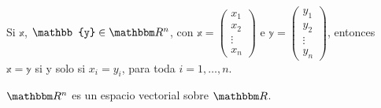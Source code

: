 \begin{observation}
    Si $\mathbb{x}$, $\mathbb{y} \in \RR[n]$, con $\displaystyle \mathbb{x} = \begin{pmatrix} x_1 \\ x_2 \\ \vdots \\ x_n \end{pmatrix}$ e $\displaystyle \mathbb{y} = \begin{pmatrix} y_1 \\ y_2 \\ \vdots \\ y_n \end{pmatrix}$, entonces $\mathbb{x} =\mathbb{y}$ si y solo si $x_i = y_i$, para toda $i = 1, \dots, n$.
\end{observation}

\begin{observation}
    $\RR[n]$ es un espacio vectorial sobre $\RR$.
\end{observation}

